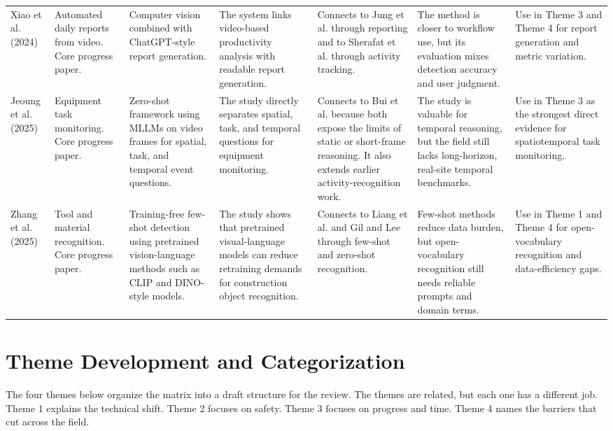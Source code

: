 \documentclass[10pt, letterpaper]{article}
\begin{document}
\begin{landscape}
\begin{longtable}{L{3.0cm} L{2.2cm} L{2.5cm} L{2.9cm} L{3.5cm} L{3.6cm} L{3.2cm}}
Xiao et al. (2024) & Automated daily reports from video. Core progress paper. & Computer vision combined with ChatGPT-style report generation. & The system links video-based productivity analysis with readable report generation. & Connects to Jung et al. through reporting and to Sherafat et al. through activity tracking. & The method is closer to workflow use, but its evaluation mixes detection accuracy and user judgment. & Use in Theme 3 and Theme 4 for report generation and metric variation. \\

Jeoung et al. (2025) & Equipment task monitoring. Core progress paper. & Zero-shot framework using MLLMs on video frames for spatial, task, and temporal event questions. & The study directly separates spatial, task, and temporal questions for equipment monitoring. & Connects to Bui et al. because both expose the limits of static or short-frame reasoning. It also extends earlier activity-recognition work. & The study is valuable for temporal reasoning, but the field still lacks long-horizon, real-site temporal benchmarks. & Use in Theme 3 as the strongest direct evidence for spatiotemporal task monitoring. \\

Zhang et al. (2025) & Tool and material recognition. Core progress paper. & Training-free few-shot detection using pretrained vision-language methods such as CLIP and DINO-style models. & The study shows that pretrained visual-language models can reduce retraining demands for construction object recognition. & Connects to Liang et al. and Gil and Lee through few-shot and zero-shot recognition. & Few-shot methods reduce data burden, but open-vocabulary recognition still needs reliable prompts and domain terms. & Use in Theme 1 and Theme 4 for open-vocabulary recognition and data-efficiency gaps. \\

\end{longtable}
\end{landscape}

\section{Theme Development and Categorization}

The four themes below organize the matrix into a draft structure for the review. The themes are related, but each one has a different job. Theme 1 explains the technical shift. Theme 2 focuses on safety. Theme 3 focuses on progress and time. Theme 4 names the barriers that cut across the field.
\end{document}
